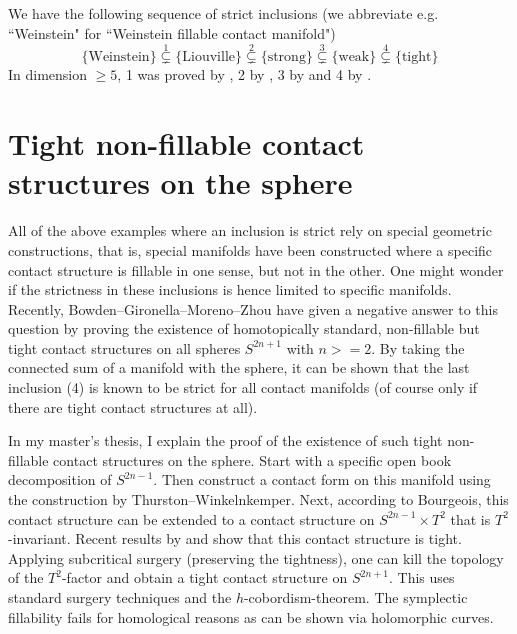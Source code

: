 \documentclass[a4paper]{amsart}
\begin{document}
We have the following sequence of strict inclusions (we abbreviate e.g. ``Weinstein" for ``Weinstein fillable contact manifold")
\[
      \{\text{Weinstein}\} \overset{1}{\subsetneq} \{\text{Liouville}\} \overset{2}{\subsetneq} \{\text{strong}\} \overset{3}{\subsetneq} \{\text{weak}\} \overset{4}{\subsetneq} \{\text{tight}\}
\]
In dimension $\ge 5$, 1 was proved by \cite[Theorem 1.5]{BCS14}, 2 by \cite{Zhou21}, 3 by \cite{BGM22} and 4 by \cite{MNW13}.



\section*{Tight non-fillable contact structures on the sphere}

All of the above examples where an inclusion is strict rely on special geometric
constructions, that is, special manifolds have been constructed where a specific
contact structure is fillable in one sense, but not in the other.
One might wonder if the strictness in these inclusions is hence limited
to specific manifolds. 
Recently, Bowden--Gironella--Moreno--Zhou \cite{BGMZ22} have given a negative answer to this question by proving the existence of homotopically standard, non-fillable but tight contact structures on all spheres $S^{2n+1}$ with $n >= 2$.
By taking the connected sum of a manifold with the sphere, it can be shown that the last inclusion (4) is known to be strict for all contact manifolds (of course only if there are tight contact structures at all).

In my master's thesis, I explain the proof of the existence of such tight non-fillable contact structures on the sphere.
Start with a specific open book decomposition of $S^{2n-1}$.
Then construct a contact form on this manifold using the construction by Thurston--Winkelnkemper. 
Next, according to Bourgeois, this contact structure can be extended to a contact structure on $S^{2n-1}\times T^2$ that is $T^2$-invariant.
Recent results by \cite{BGM22} and \cite{AZ24} show that this contact structure is tight.
Applying subcritical surgery (preserving the tightness), one can kill the topology of the $T^2$-factor and obtain a tight contact structure on $S^{2n+1}$.
This uses standard surgery techniques and the $h$-cobordism-theorem.
The symplectic fillability fails for homological reasons as can be shown via holomorphic curves. 
\end{document}
